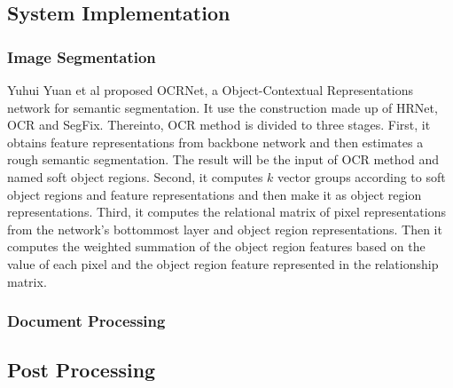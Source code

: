 \documentclass[10pt, conference, compsocconf]{IEEEtran}
\begin{document}


		\subsection{System Implementation}

			\subsubsection{Image Segmentation}


			Yuhui Yuan et al proposed OCRNet, a Object-Contextual Representations network for semantic segmentation. 
			It use the construction made up of HRNet, OCR and SegFix. 
			Thereinto, OCR method is divided to three stages. 
			First, it obtains feature representations from backbone network and then estimates a rough semantic segmentation. 
			The result will be the input of OCR method and named soft object regions.
			Second, it computes $k$ vector groups according to soft object regions and feature representations and then make it as object region representations. 
			Third, it computes the relational matrix of pixel representations from the network's bottommost layer and object region representations. 
			Then it computes the weighted summation of the object region features based on the value of each pixel and the object region feature represented in the relationship matrix. 

			


			\subsubsection{Document Processing}



		\subsection{Post Processing}

\end{document}
